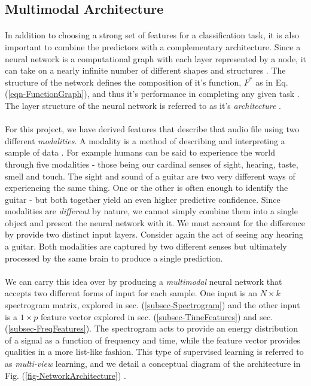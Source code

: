 \documentclass[12pt,letterpaper]{article}
\begin{document}

\subsection{Multimodal Architecture}
\label{subsec-Architecture}

\paragraph*{}In addition to choosing a strong set of features for a classification task, it is also important to combine the predictors with a complementary architecture. Since a neural network is a computational graph with each layer represented by a node, it can take on a nearly infinite number of different shapes and structures \cite{Goodfellow,Virtanen}. The structure of the network defines the composition of it's function, $F^*$ as in Eq.(\ref{eqn-FunctionGraph}), and thus it's performance in completing any given task \cite{Geron}. The layer structure of the neural network is referred to as it's \textit{architecture} \cite{Goodfellow}. 

\paragraph*{}For this project, we have derived features that describe that audio file using two different \textit{modalities}. A modality is a method of describing and interpreting a sample of data \cite{Ngiam}. For example humans can be said to experience the world through five modalities - those being our cardinal senses of sight, hearing, taste, smell and touch. The sight and sound of a guitar are two very different ways of experiencing the same thing. One or the other is often enough to identify the guitar - but both together yield an even higher predictive confidence. Since modalities are \textit{different} by nature, we cannot simply combine them into a single object and present the neural network with it. We must account for the difference by provide two distinct input layers. Consider again the act of seeing any hearing a guitar. Both modalities are captured by two different senses but ultimately processed by the same brain to produce a single prediction.

\paragraph*{}We can carry this idea over by producing a \textit{multimodal} neural network that accepts two different forms of input for each sample. One input is an $N \times k$ spectrogram matrix, explored in sec. (\ref{subsec-Spectrogram}) and the other input is a $1 \times p$ feature vector explored in sec. (\ref{subsec-TimeFeatures}) and sec. (\ref{subsec-FreqFeatures}). The spectrogram acts to provide an energy distribution of a signal as a function of frequency and time, while the feature vector provides qualities in a more list-like fashion. This type of supervised learning is referred to as \textit{multi-view} learning, and we detail a conceptual diagram of the architecture in Fig. (\ref{fig-NetworkArchitecture}) \cite{Li,Ngiam}.
\end{document}

